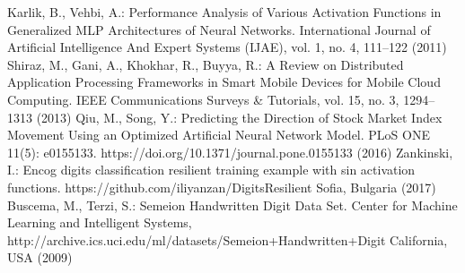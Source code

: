 \documentclass{llncs}
\begin{document}
\begin{thebibliography}{}
Karlik, B., Vehbi, A.:
Performance Analysis of Various Activation Functions in Generalized MLP Architectures of Neural Networks.
International Journal of Artificial Intelligence And Expert Systems (IJAE), vol. 1, no. 4, 111--122 (2011) 
%
Shiraz, M., Gani, A., Khokhar, R., Buyya, R.:
A Review on Distributed Application Processing Frameworks in Smart Mobile Devices for Mobile Cloud Computing.
IEEE Communications Surveys \& Tutorials, vol. 15, no. 3, 1294--1313 (2013) 
%
Qiu, M., Song, Y.:
Predicting the Direction of Stock Market Index Movement Using an Optimized Artificial Neural Network Model.
PLoS ONE 11(5): e0155133. https://doi.org/10.1371/journal.pone.0155133 (2016)
%
Zankinski, I.:
Encog digits classification resilient training example with sin activation functions.
https://github.com/iliyanzan/DigitsResilient Sofia, Bulgaria  (2017)
%
Buscema, M., Terzi, S.:
Semeion Handwritten Digit Data Set.
Center for Machine Learning and Intelligent Systems, http://archive.ics.uci.edu/ml/datasets/Semeion+Handwritten+Digit California, USA  (2009)
%
\end{thebibliography}
\end{document}
